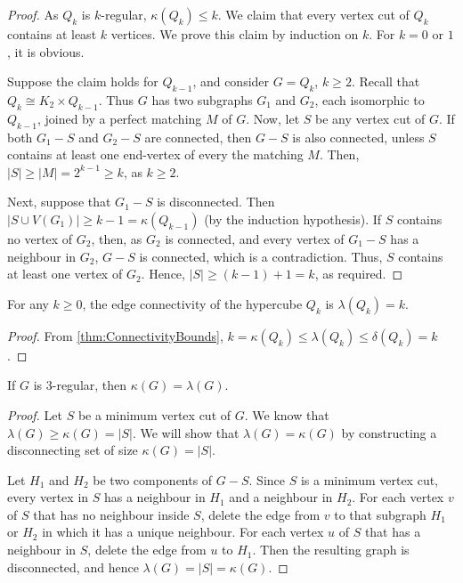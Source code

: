 \begin{proof}
As $Q_k$ is $k$-regular, $\kappa(Q_k) \le k$. We claim that every vertex cut of $Q_k$ contains at least $k$ vertices. We prove this claim by induction on $k$. For $k = 0$ or $1$, it is obvious.

Suppose the claim holds for $Q_{k - 1}$, and consider $G = Q_k$, $k \ge 2$. Recall that $Q_k \cong K_2 \times Q_{k - 1}$. Thus $G$ has two subgraphs $G_1$ and $G_2$, each isomorphic to $Q_{k - 1}$, joined by a perfect matching $M$ of $G$. Now, let $S$ be any vertex cut of $G$. If both $G_1 - S$ and $G_2 - S$ are connected, then $G - S$ is also connected, unless $S$ contains at least one end-vertex of every the matching $M$. Then, $|S| \ge |M| = 2^{k - 1} \ge k$, as $k \ge 2$.

Next, suppose that $G_1 - S$ is disconnected. Then $|S \cup V(G_1)| \ge k - 1 = \kappa(Q_{k - 1})$ (by the induction hypothesis). If $S$ contains no vertex of $G_2$, then, as $G_2$ is connected, and every vertex of $G_1 - S$ has a neighbour in $G_2$, $G - S$ is connected, which is a contradiction. Thus, $S$ contains at least one vertex of $G_2$. Hence, $|S| \ge (k - 1) + 1 = k$, as required.
\end{proof}

\begin{Corollary}
For any $k \ge 0$, the edge connectivity of the hypercube $Q_k$ is $\lambda(Q_k) = k$.
\end{Corollary}

\begin{proof}
From \cref{thm:ConnectivityBounds}, $k = \kappa(Q_k) \le \lambda(Q_k) \le \delta(Q_k) = k$.
\end{proof}

\begin{Theorem}
If $G$ is $3$-regular, then $\kappa(G) = \lambda(G)$.
\end{Theorem}

\begin{proof}
Let $S$ be a minimum vertex cut of $G$. We know that $\lambda(G) \ge \kappa(G) = |S|$. We will show that $\lambda(G) = \kappa(G)$ by constructing a disconnecting set of size $\kappa(G) = |S|$.


Let $H_1$ and $H_2$ be two components of $G - S$. Since $S$ is a minimum vertex cut, every vertex in $S$ has a neighbour in $H_1$ and a neighbour in $H_2$. For each vertex $v$ of $S$ that has no neighbour inside $S$, delete the edge from $v$ to that subgraph $H_1$ or $H_2$ in which it has a unique neighbour. For each vertex $u$ of $S$ that has a neighbour in $S$, delete the edge from $u$ to $H_1$. Then the resulting graph is disconnected, and hence $\lambda(G) = |S| = \kappa(G)$.
\end{proof}


